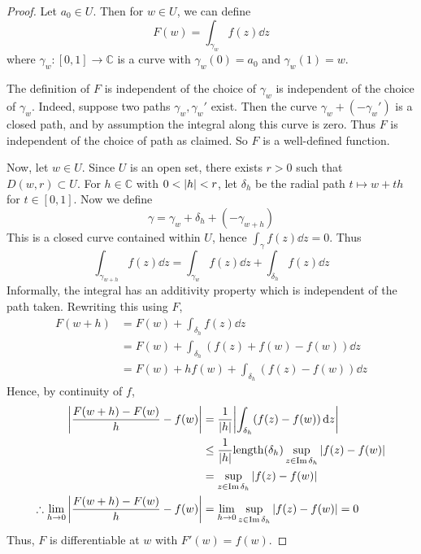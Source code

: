 \begin{proof}
	Let \( a_0 \in U \).
	Then for \( w \in U \), we can define
	\[ F(w) = \int_{\gamma_w} f(z) \dd{z} \]
	where \( \gamma_w \colon [0,1] \to \mathbb C \) is a curve with \( \gamma_w(0) = a_0 \) and \( \gamma_w(1) = w \).

	The definition of \( F \) is independent of the choice of \( \gamma_w \) is independent of the choice of \( \gamma_w \).
	Indeed, suppose two paths \( \gamma_w, \gamma_w' \) exist.
	Then the curve \( \gamma_w + (-\gamma_w') \) is a closed path, and by assumption the integral along this curve is zero.
	Thus \( F \) is independent of the choice of path as claimed.
	So \( F \) is a well-defined function.

	Now, let \( w \in U \).
	Since \( U \) is an open set, there exists \( r > 0 \) such that \( D(w,r) \subset U \).
	For \( h \in \mathbb C \) with \( 0 < \abs{h} < r \), let \( \delta_h \) be the radial path \( t \mapsto w + th \) for \( t \in [0,1] \).
	Now we define
	\[ \gamma = \gamma_w + \delta_h + (-\gamma_{w+h}) \]
	This is a closed curve contained within \( U \), hence \( \int_\gamma f(z) \dd{z} = 0 \).
	Thus
	\[ \int_{\gamma_{w+h}} f(z) \dd{z} = \int_{\gamma_w} f(z) \dd{z} + \int_{\delta_h} f(z) \dd{z} \]
	Informally, the integral has an additivity property which is independent of the path taken.
	Rewriting this using \( F \),
	\begin{align*}
		F(w+h) &= F(w) + \int_{\delta_h} f(z) \dd{z} \\
		&= F(w) + \int_{\delta_h} (f(z) + f(w) - f(w)) \dd{z} \\
		&= F(w) + hf(w) + \int_{\delta_h} (f(z) - f(w)) \dd{z}
	\end{align*}
	Hence, by continuity of \( f \),
	\begin{align*}
		\abs{\frac{F(w+h) - F(w)}{h} - f(w)} &= \frac{1}{\abs{h}} \abs{\int_{\delta_h} (f(z) - f(w)) \dd{z}} \\
		&\leq \frac{1}{\abs{h}} \mathrm{length}(\delta_h) \sup_{z \in \Im \delta_h} \abs{f(z) - f(w)} \\
		&= \sup_{z \in \Im \delta_h} \abs{f(z) - f(w)} \\
		\therefore \lim_{h \to 0} \abs{\frac{F(w+h) - F(w)}{h} - f(w)} &= \lim_{h \to 0} \sup_{z \in \Im \delta_h} \abs{f(z) - f(w)} = 0
	\end{align*}
	Thus, \( F \) is differentiable at \( w \) with \( F'(w) = f(w) \).
\end{proof}

